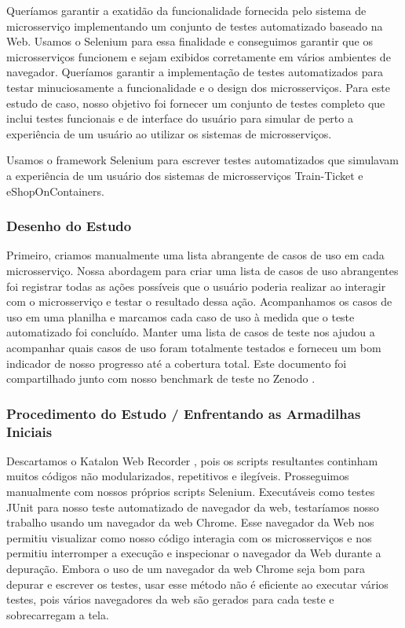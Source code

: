 Queríamos garantir a exatidão da funcionalidade fornecida pelo sistema de microsserviço implementando um conjunto de testes automatizado baseado na Web. Usamos o Selenium para essa finalidade e conseguimos garantir que os microsserviços funcionem e sejam exibidos corretamente em vários ambientes de navegador. Queríamos garantir a implementação de testes automatizados para testar minuciosamente a funcionalidade e o design dos microsserviços. Para este estudo de caso, nosso objetivo foi fornecer um conjunto de testes completo que inclui testes funcionais e de interface do usuário para simular de perto a experiência de um usuário ao utilizar os sistemas de microsserviços.

Usamos o framework Selenium para escrever testes automatizados que simulavam a experiência de um usuário dos sistemas de microsserviços Train-Ticket e eShopOnContainers.


\subsubsection{Desenho do Estudo}
Primeiro, criamos manualmente uma lista abrangente de casos de uso em cada microsserviço. Nossa abordagem para criar uma lista de casos de uso abrangentes foi registrar todas as ações possíveis que o usuário poderia realizar ao interagir com o microsserviço e testar o resultado dessa ação. Acompanhamos os casos de uso em uma planilha e marcamos cada caso de uso à medida que o teste automatizado foi concluído. Manter uma lista de casos de teste nos ajudou a acompanhar quais casos de uso foram totalmente testados e forneceu um bom indicador de nosso progresso até a cobertura total. Este documento foi compartilhado junto com nosso benchmark de teste no Zenodo \cite{zenodo_benchmark}.

\subsubsection{Procedimento do Estudo / Enfrentando as Armadilhas Iniciais}
Descartamos o Katalon Web Recorder \cite{katalon}, pois os scripts resultantes continham muitos códigos não modularizados, repetitivos e ilegíveis. Prosseguimos manualmente com nossos próprios scripts Selenium. Executáveis como testes JUnit para nosso teste automatizado de navegador da web, testaríamos nosso trabalho usando um navegador da web Chrome. Esse navegador da Web nos permitiu visualizar como nosso código interagia com os microsserviços e nos permitiu interromper a execução e inspecionar o navegador da Web durante a depuração. Embora o uso de um navegador da web Chrome seja bom para depurar e escrever os testes, usar esse método não é eficiente ao executar vários testes, pois vários navegadores da web são gerados para cada teste e sobrecarregam a tela.

